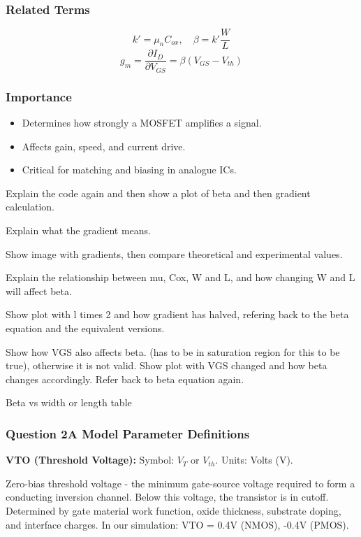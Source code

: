 \documentclass[a4paper,12pt]{article}
\begin{document}
\subsubsection{Related Terms}
\[
k' = \mu_n C_{ox}, \quad \beta = k'\frac{W}{L}
\]
\[
g_m = \frac{\partial I_D}{\partial V_{GS}} = \beta(V_{GS} - V_{th})
\]

\subsubsection{Importance}
\begin{itemize}
    \item Determines how strongly a MOSFET amplifies a signal.
    \item Affects gain, speed, and current drive.
    \item Critical for matching and biasing in analogue ICs.
\end{itemize}

Explain the code again and then show a plot of beta and then gradient calculation.

Explain what the gradient means.

Show image with gradients, then compare theoretical and experimental values.

Explain the relationship between mu, Cox, W and L, and how changing W and L will affect beta.

Show plot with l times 2 and how gradient has halved, refering back to the beta equation and the equivalent versions.

Show how VGS also affects beta. (has to be in saturation region for this to be true), otherwise it is not valid.
Show plot with VGS changed and how beta changes accordingly.
Refer back to beta equation again.

Beta vs width or length table

\subsubsection{Question 2A\: Model Parameter Definitions}

\textbf{VTO (Threshold Voltage):}
Symbol: $V_T$ or $V_{th}$. Units: Volts (V).

Zero-bias threshold voltage - the minimum gate-source voltage required to form a conducting inversion channel. Below this voltage, the transistor is in cutoff. Determined by gate material work function, oxide thickness, substrate doping, and interface charges. In our simulation: VTO = 0.4V (NMOS), -0.4V (PMOS).
\end{document}

